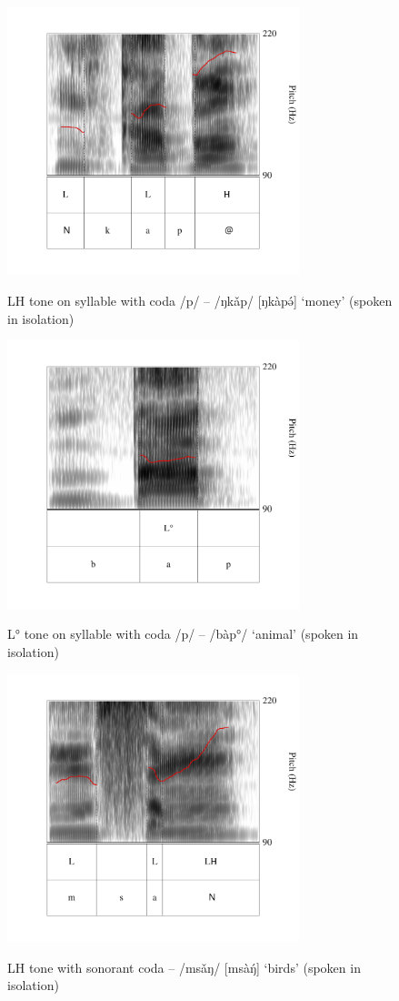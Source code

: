 \documentclass[output=paper,colorlinks,citecolor=brown,draft,draftmode]{langscibook}
\begin{document}
\begin{figure}[p]
\caption{LH tone on syllable with coda /p/ -- /ŋkǎp/ [ŋkàp\'ə] `money'  (spoken in isolation)}
\includegraphics[width=8.5cm]{figures/fig2_nkape.pdf}
\label{fig:riseP}
\end{figure}

\begin{figure}[p]
\caption{L°{} tone on syllable with coda /p/ -- /bàp°/ `animal'  (spoken in isolation)}
\includegraphics[width=8.5cm]{figures/fig3_bap.pdf}
\label{fig:levelP}
\end{figure}

\begin{figure}[p]
\caption{LH tone with sonorant coda -- /msǎŋ/ [msà\'{ŋ}] `birds'   (spoken in isolation)}
\includegraphics[width=8.5cm]{figures/fig4_msan.pdf}
\label{fig:riseN}
\end{figure}
\end{document}
